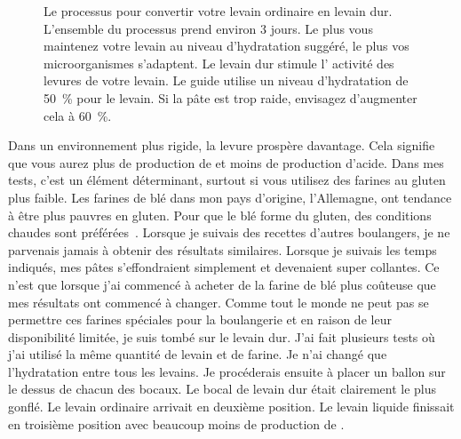 \begin{figure}[!htb]
\begin{center}
  
  \caption[Conversion en levain dur]{Le processus pour convertir votre levain
      ordinaire en levain dur. L'ensemble du processus prend environ 3 jours. Le
      plus vous maintenez votre levain au niveau d'hydratation suggéré, le
      plus vos microorganismes s'adaptent. Le levain dur stimule l'
      activité des levures de votre levain. Le guide utilise un
      niveau d'hydratation de \qty{50}{\percent} pour le levain. Si la pâte est trop
      raide, envisagez d'augmenter cela à \qty{60}{\percent}.}%
  \label{fig:stiff-starter-conversion}
\end{center}
\end{figure}

Dans un environnement plus rigide, la levure prospère davantage. Cela signifie que vous aurez
plus de production de  et moins de production d'acide. Dans mes tests, c'est un élément déterminant,
surtout si vous utilisez des farines au gluten plus faible. Les farines de blé dans
mon pays d'origine, l'Allemagne, ont tendance à être plus pauvres en gluten. Pour que le blé forme du gluten, des conditions chaudes
sont préférées~\cite{gluten+development+temperatures}. Lorsque je suivais des recettes
d'autres boulangers, je ne parvenais jamais à obtenir des résultats similaires. Lorsque je suivais
les temps indiqués, mes pâtes s'effondraient simplement et devenaient super collantes. Ce n'est que lorsque j'ai commencé à acheter de la farine de blé plus
coûteuse que mes résultats ont commencé à changer. Comme tout le monde ne peut pas se permettre
ces farines spéciales pour la boulangerie et en raison de leur disponibilité limitée, je suis tombé sur le
levain dur. J'ai fait plusieurs tests où j'ai utilisé la même quantité de
levain et de farine. Je n'ai changé que l'hydratation entre tous les levains.
Je procéderais ensuite à placer un ballon sur le dessus de chacun des bocaux. Le bocal de
levain dur était clairement le plus gonflé. Le levain ordinaire
arrivait en deuxième position. Le levain liquide finissait en troisième position avec beaucoup moins de production de .

